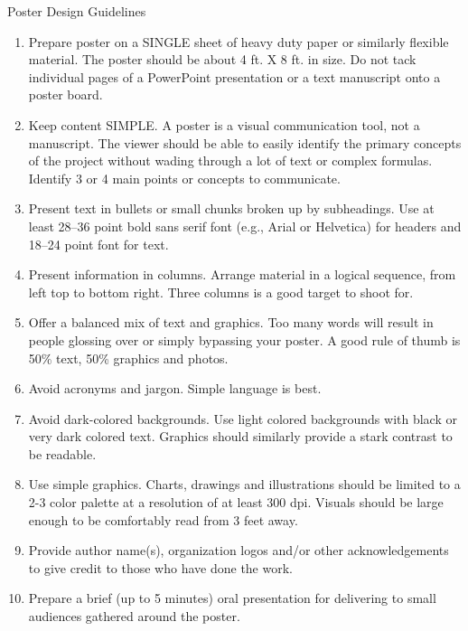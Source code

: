 \documentclass{article}
\begin{document}
\begin{frame}[t]
\begin{columns}[t]
\begin{column}{\colwidth}
\begin{block}{Poster Design Guidelines}
    \begin{enumerate}
        \item Prepare poster on a SINGLE sheet of heavy duty paper or similarly flexible material. The poster should be about 4 ft. X 8 ft. in size. Do not tack individual pages of a PowerPoint presentation or a text manuscript onto a poster
board.
\item Keep content SIMPLE. A poster is a visual communication tool, not a manuscript. The viewer should be able to easily identify the primary concepts of the project without wading through a lot of text or complex formulas. Identify 3 or 4 main points or concepts to communicate.
\item Present text in bullets or small chunks broken up by subheadings. Use at least 28--36 point bold sans serif font (e.g., Arial or Helvetica) for headers and 18--24 point font for text.
\item Present information in columns. Arrange material in a logical sequence, from left top to bottom right. Three columns is a good target to shoot for.
\item Offer a balanced mix of text and graphics. Too many words will result in people glossing over or simply bypassing your poster. A good rule of thumb is 50\% text, 50\% graphics and photos.
\item Avoid acronyms and jargon. Simple language is best.
\item Avoid dark-colored backgrounds. Use light colored backgrounds with black or very dark colored text. Graphics should similarly provide a stark contrast to be readable.
\item Use simple graphics. Charts, drawings and illustrations should be limited to a 2-3 color palette at a resolution of at least 300 dpi. Visuals should be large enough to be comfortably read from 3 feet away.
\item Provide author name(s), organization logos and/or other acknowledgements to give credit to those who have done the work.
\item Prepare a brief (up to 5 minutes) oral presentation for delivering to small audiences gathered around the poster.
    \end{enumerate}
\end{block}





\end{column}


\end{columns}
\end{frame}
\end{document}
